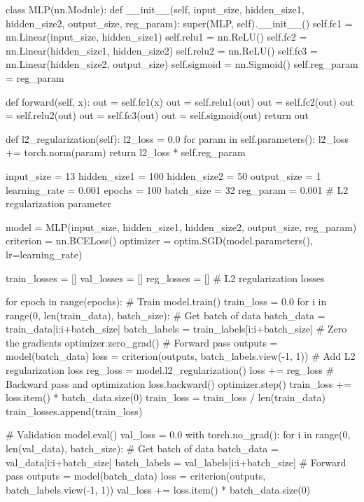 \documentclass[11pt]{article}
\begin{document}
\begin{python}
class MLP(nn.Module):
    def __init__(self, input_size, hidden_size1, hidden_size2, output_size, reg_param):
        super(MLP, self).__init__()
        self.fc1 = nn.Linear(input_size, hidden_size1)
        self.relu1 = nn.ReLU()
        self.fc2 = nn.Linear(hidden_size1, hidden_size2)
        self.relu2 = nn.ReLU()
        self.fc3 = nn.Linear(hidden_size2, output_size)
        self.sigmoid = nn.Sigmoid()
        self.reg_param = reg_param
        
    def forward(self, x):
        out = self.fc1(x)
        out = self.relu1(out)
        out = self.fc2(out)
        out = self.relu2(out)
        out = self.fc3(out)
        out = self.sigmoid(out)
        return out
      
    def l2_regularization(self):
        l2_loss = 0.0
        for param in self.parameters():
            l2_loss += torch.norm(param)
        return l2_loss * self.reg_param
      
input_size = 13
hidden_size1 = 100
hidden_size2 = 50
output_size = 1
learning_rate = 0.001
epochs = 100
batch_size = 32
reg_param = 0.001 # L2 regularization parameter

model = MLP(input_size, hidden_size1, hidden_size2, output_size, reg_param)
criterion = nn.BCELoss()
optimizer = optim.SGD(model.parameters(), lr=learning_rate)

train_losses = []
val_losses = []
reg_losses = [] # L2 regularization losses

for epoch in range(epochs):
    # Train
    model.train()
    train_loss = 0.0
    for i in range(0, len(train_data), batch_size):
        # Get batch of data
        batch_data = train_data[i:i+batch_size]
        batch_labels = train_labels[i:i+batch_size]
        # Zero the gradients
        optimizer.zero_grad()
        # Forward pass
        outputs = model(batch_data)
        loss = criterion(outputs, batch_labels.view(-1, 1))
        # Add L2 regularization loss
        reg_loss = model.l2_regularization()
        loss += reg_loss
        # Backward pass and optimization
        loss.backward()
        optimizer.step()
        train_loss += loss.item() * batch_data.size(0)
    train_loss = train_loss / len(train_data)
    train_losses.append(train_loss)
    
    # Validation
    model.eval()
    val_loss = 0.0
    with torch.no_grad():
        for i in range(0, len(val_data), batch_size):
            # Get batch of data
            batch_data = val_data[i:i+batch_size]
            batch_labels = val_labels[i:i+batch_size]  
                    # Forward pass
            outputs = model(batch_data)
            loss = criterion(outputs, batch_labels.view(-1, 1))
            val_loss += loss.item() * batch_data.size(0)
        

\end{python}
\end{document}
